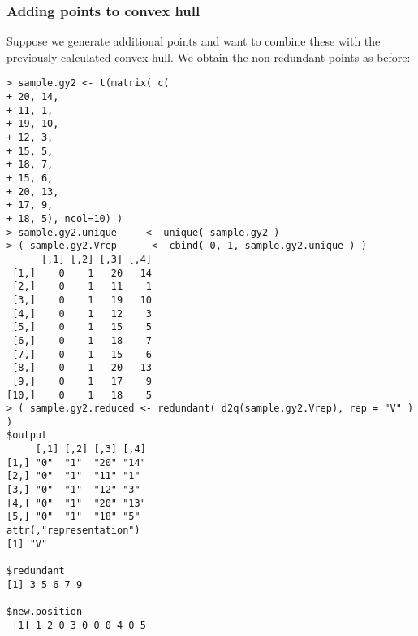 \subsubsection{Adding points to convex hull}
Suppose we generate additional points and want to combine these with the previously 
calculated convex hull.  We obtain the non-redundant points as before:
{ \singlespace
\begin{verbatim}
> sample.gy2 <- t(matrix( c(
+ 20, 14,
+ 11, 1,
+ 19, 10,
+ 12, 3,
+ 15, 5,
+ 18, 7,
+ 15, 6,
+ 20, 13,
+ 17, 9,
+ 18, 5), ncol=10) ) 
> sample.gy2.unique 	<- unique( sample.gy2 ) 
> ( sample.gy2.Vrep 	 <- cbind( 0, 1, sample.gy2.unique ) )
      [,1] [,2] [,3] [,4]
 [1,]    0    1   20   14
 [2,]    0    1   11    1
 [3,]    0    1   19   10
 [4,]    0    1   12    3
 [5,]    0    1   15    5
 [6,]    0    1   18    7
 [7,]    0    1   15    6
 [8,]    0    1   20   13
 [9,]    0    1   17    9
[10,]    0    1   18    5
> ( sample.gy2.reduced <- redundant( d2q(sample.gy2.Vrep), rep = "V" ) )
$output
     [,1] [,2] [,3] [,4]
[1,] "0"  "1"  "20" "14"
[2,] "0"  "1"  "11" "1" 
[3,] "0"  "1"  "12" "3" 
[4,] "0"  "1"  "20" "13"
[5,] "0"  "1"  "18" "5" 
attr(,"representation")
[1] "V"

$redundant
[1] 3 5 6 7 9

$new.position
 [1] 1 2 0 3 0 0 0 4 0 5
\end{verbatim}
}

